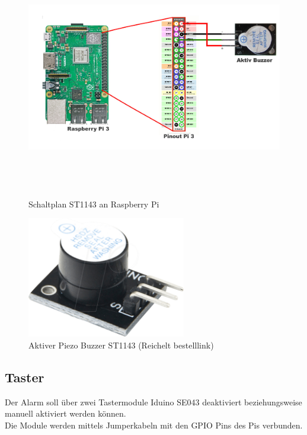 \documentclass[12pt,a4paper,openany]{scrbook}
\begin{document}
	
	\begin{figure}[!h]
	\centering
	\includegraphics[height=300pt]{img/schaltplan}
	\caption{Schaltplan ST1143 an Raspberry Pi}
	\label{Bildlabel}
	
\end{figure}

	\begin{figure}[H]
	\centering
	\includegraphics[height=150pt]{img/ST1143}
	\caption{Aktiver Piezo Buzzer ST1143 (Reichelt bestelllink)}
	\label{Bildlabel}
	\end{figure}



\subsection{Taster}

Der Alarm soll über zwei Tastermodule Iduino SE043 deaktiviert beziehungsweise manuell aktiviert werden können.\\ 
Die Module werden mittels Jumperkabeln mit den GPIO Pins des Pis verbunden. \\ 
\end{document}
